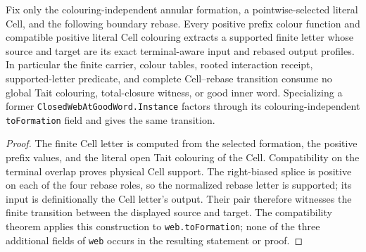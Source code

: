 \begin{proposition}
\label{prop:selected-cell-rebase-formation-local}
Fix only the colouring-independent annular formation, a pointwise-selected
literal Cell, and the following boundary rebase.  Every positive prefix
colour function and compatible positive literal Cell colouring extracts a
supported finite letter whose source and target are its exact terminal-aware
input and rebased output profiles.  In particular the finite carrier, colour
tables, rooted interaction receipt, supported-letter predicate, and complete
Cell--rebase transition consume no global Tait colouring, total-closure
witness, or good inner word.  Specializing a former
\texttt{ClosedWebAtGoodWord.Instance} factors through its
colouring-independent \texttt{toFormation} field and gives the same
transition.
\end{proposition}

\begin{proof}
The finite Cell letter is computed from the selected formation, the positive
prefix values, and the literal open Tait colouring of the Cell.  Compatibility
on the terminal overlap proves physical Cell support.  The right-biased splice
is positive on each of the four rebase roles, so the normalized rebase letter
is supported; its input is definitionally the Cell letter's output.  Their
pair therefore witnesses the finite transition between the displayed source
and target.  The compatibility theorem applies this construction to
\texttt{web.toFormation}; none of the three additional fields of
\texttt{web} occurs in the resulting statement or proof.
\end{proof}

